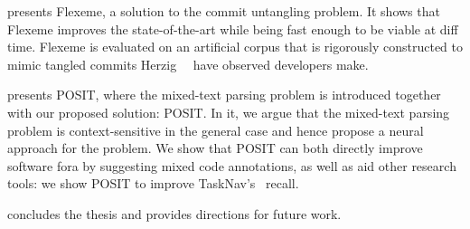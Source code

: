  presents Flexeme, a solution to the commit untangling
problem. It shows that Flexeme improves the state-of-the-art while being fast
enough to be viable at diff time. Flexeme is evaluated on an artificial corpus
that is rigorously constructed to mimic tangled commits
Herzig~\etal~\cite{Herzig2016} have observed developers make.

 presents POSIT, where the mixed-text parsing problem is
introduced together with our proposed solution: POSIT. In it, we argue that the
mixed-text parsing problem is context-sensitive in the general case and hence
propose a neural approach for the problem. We show that POSIT can both directly
improve software fora by suggesting mixed code annotations, as well as aid other
research tools: we show POSIT to improve
TaskNav's~\cite{Treude:2015:TTN:2819009.2819128} recall.

 concludes the thesis and provides directions for
future work.